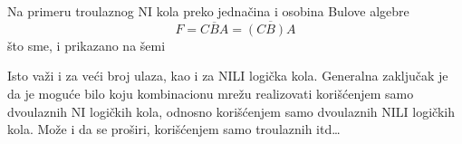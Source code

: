 \begin{frame}[label=02-s031]
Na primeru troulaznog NI kola preko jednačina i osobina Bulove algebre
\[
F=\overline{CBA}=\overline{(CB)A}
\]
što \alert{sme}, i prikazano na šemi

\vspace{4mm}\centering
\par
\vspace{4mm}\raggedright
Isto važi i za veći broj ulaza, kao i za NILI logička kola. Generalna zaključak je da je moguće bilo koju kombinacionu mrežu realizovati korišćenjem samo dvoulaznih NI logičkih kola, odnosno korišćenjem samo dvoulaznih NILI logičkih kola. Može i da se proširi, korišćenjem samo troulaznih itd\ldots
\end{frame}
